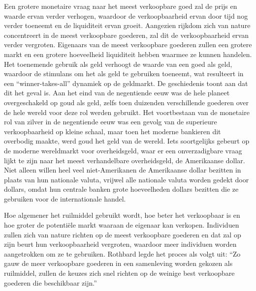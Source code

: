 Een grotere monetaire vraag naar het meest verkoopbare goed zal de prijs en waarde ervan verder verhogen, waardoor de verkoopbaarheid ervan door tijd nog verder toeneemt en de liquiditeit ervan groeit. Aangezien rijkdom zich van nature concentreert in de meest verkoopbare goederen, zal dit de verkoopbaarheid ervan verder vergroten. Eigenaars van de meest verkoopbare goederen zullen een grotere markt en een grotere hoeveelheid liquiditeit hebben waarmee ze kunnen handelen. Het toenemende gebruik als geld verhoogt de waarde van een goed als geld, waardoor de stimulans om het als geld te gebruiken toeneemt, wat resulteert in een ``winner-takes-all'' dynamiek op de geldmarkt. De geschiedenis toont aan dat dit het geval is. Aan het eind van de negentiende eeuw was de hele planeet overgeschakeld op goud als geld, zelfs toen duizenden verschillende goederen over de hele wereld voor deze rol werden gebruikt. Het voortbestaan van de monetaire rol van zilver in de negentiende eeuw was een gevolg van de superieure verkoopbaarheid op kleine schaal, maar toen het moderne bankieren dit overbodig maakte, werd goud het geld van de wereld. Iets soortgelijks gebeurt op de moderne wereldmarkt voor overheidsgeld, waar er een onverzadigbare vraag lijkt te zijn naar het meest verhandelbare overheidsgeld, de Amerikaanse dollar. Niet alleen willen heel veel niet-Amerikanen de Amerikaanse dollar bezitten in plaats van hun nationale valuta, vrijwel alle nationale valuta worden gedekt door dollars, omdat hun centrale banken grote hoeveelheden dollars bezitten die ze gebruiken voor de internationale handel.

Hoe algemener het ruilmiddel gebruikt wordt, hoe beter het verkoopbaar is en hoe groter de potentiële markt waaraan de eigenaar kan verkopen. Individuen zullen zich van nature richten op de meest verkoopbare goederen en dat zal op zijn beurt hun verkoopbaarheid vergroten, waardoor meer individuen worden aangetrokken om ze te gebruiken. Rothbard legde het proces als volgt uit: ``Zo gauw de meer verkoopbare goederen in een samenleving worden gekozen als ruilmiddel, zullen de keuzes zich snel richten op de weinige best verkoopbare goederen die beschikbaar zijn.''\autocite{114}

